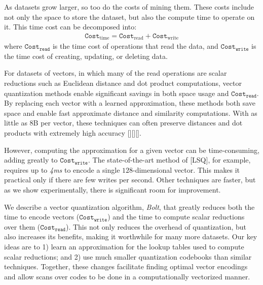 


As datasets grow larger, so too do the costs of mining them. These costs include not only the space to store the dataset, but also the compute time to operate on it. This time cost can be decomposed into:
\begin{align}
    \texttt{Cost}_{\text{time}} = \texttt{Cost}_{\text{read}} + \texttt{Cost}_{\text{write}}
\end{align}
where $\texttt{Cost}_{\texttt{read}}$ is the time cost of operations that read the data, and $\texttt{Cost}_{\texttt{write}}$ is the time cost of creating, updating, or deleting data.

For datasets of vectors, in which many of the read operations are scalar reductions such as Euclidean distance and dot product computations, vector quantization methods enable significant savings in both space usage and $\texttt{Cost}_{\texttt{read}}$. By replacing each vector with a learned approximation, these methods both save space and enable fast approximate distance and similarity computations. With as little as 8B per vector, these techniques can often preserve distances and dot products with extremely high accuracy [][][].







However, computing the approximation for a given vector can be time-consuming, adding greatly to $\texttt{Cost}_{\texttt{write}}$. The state-of-the-art method of [LSQ], for example, requires up to \textit{4ms} to encode a single $128$-dimensional vector. This makes it practical only if there are few writes per second. Other techniques are faster, but as we show experimentally, there is significant room for improvement.

We describe a vector quantization algorithm, \textit{Bolt}, that greatly reduces both the time to encode vectors ($\texttt{Cost}_{\texttt{write}}$) and the time to compute scalar reductions over them ($\texttt{Cost}_{\texttt{read}}$). This not only reduces the overhead of quantization, but also increases its benefits, making it worthwhile for many more datasets. Our key ideas are to 1) learn an approximation for the lookup tables used to compute scalar reductions; and 2) use much smaller quantization codebooks than similar techniques. Together, these changes facilitate finding optimal vector encodings and allow scans over codes to be done in a computationally vectorized manner.

